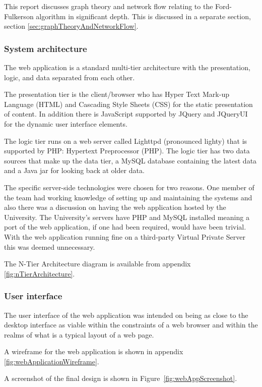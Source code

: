This report discusses graph theory and network flow relating to the
Ford-Fulkerson algorithm in significant depth. This is discussed in a separate
section, section \ref{sec:graphTheoryAndNetworkFlow}.

\subsubsection{System architecture}

The web application is a standard multi-tier architecture with the 
presentation, logic, and data separated from each other.

The presentation tier is the client/browser who has Hyper Text Mark-up Language
(HTML) and Cascading Style Sheets (CSS) for the static presentation of content.
In addition there is JavaScript supported by JQuery and JQueryUI for the dynamic
user interface elements.

The logic tier runs on a web server called Lighttpd (pronounced lighty) that is
supported by PHP: Hypertext Preprocessor (PHP). The logic tier has two data
sources that make up the data tier, a MySQL database containing the latest data
and a Java jar for looking back at older data.

The specific server-side technologies were chosen for two reasons. One member
of the team had working knowledge of setting up and maintaining the systems and
also there was a discussion on having the web application hosted by the
University. The University's servers have PHP and MySQL installed meaning a
port of the web application, if one had been required, would have been trivial.
With the web application running fine on a third-party Virtual Private Server
this was deemed unnecessary.

The N-Tier Architecture diagram is available from appendix
\ref{fig:nTierArchitecture}.

\subsubsection{User interface}

The user interface of the web application was intended on being as close to the
desktop interface as viable within the constraints of a web browser and within
the realms of what is a typical layout of a web page.

A wireframe for the web application is shown in appendix
\ref{fig:webApplicationWireframe}.

A screenshot of the final design is shown in Figure~\ref{fig:webAppScreenshot}.

